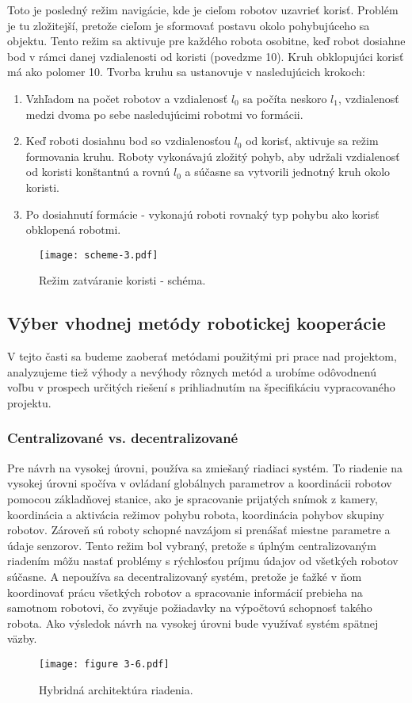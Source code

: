 Toto je posledný režim navigácie, kde je cieľom robotov uzavrieť korisť. Problém je tu zložitejší, pretože cieľom je sformovať postavu okolo pohybujúceho sa objektu. Tento režim sa aktivuje pre každého robota osobitne, keď robot dosiahne bod v rámci danej vzdialenosti od koristi (povedzme 10). Kruh obklopujúci korisť má ako polomer 10. Tvorba kruhu sa ustanovuje v nasledujúcich krokoch:
\begin{enumerate}
    \item Vzhľadom na počet robotov a vzdialenosť $l_0$ sa počíta
        neskoro $l_1$, vzdialenosť medzi dvoma po sebe nasledujúcimi robotmi vo formácii.
    \item Keď roboti dosiahnu bod so vzdialenosťou $l_0$ od
        korisť, aktivuje sa režim formovania kruhu. Roboty vykonávajú zložitý pohyb, aby udržali vzdialenosť od koristi konštantnú a rovnú $l_0$ a súčasne sa vytvorili
        jednotný kruh okolo koristi.
    \item Po dosiahnutí formácie - vykonajú roboti rovnaký typ pohybu ako korisť obklopená robotmi. 
\end{enumerate} 

\begin{figure}[ht!]
    \centering
    \texttt{[image: scheme-3.pdf]}
    \caption{Režim zatváranie koristi - schéma.}
    \label{o:39}
\end{figure}

\subsection{Výber vhodnej metódy robotickej kooperácie}
V tejto časti sa budeme zaoberať metódami použitými pri prace nad projektom, analyzujeme tiež výhody a nevýhody rôznych metód a urobíme odôvodnenú voľbu v prospech určitých riešení s prihliadnutím na špecifikáciu vypracovaného projektu.

\subsubsection{Centralizované vs. decentralizované}
Pre návrh na vysokej úrovni, používa sa zmiešaný riadiaci systém. To riadenie na vysokej úrovni spočíva v ovládaní globálnych parametrov a koordinácii robotov pomocou 
základňovej stanice, ako je spracovanie prijatých snímok z kamery, koordinácia a aktivácia režimov pohybu robota, 
koordinácia pohybov skupiny robotov. Zároveň sú roboty schopné navzájom si prenášať miestne parametre a údaje senzorov.
Tento režim bol vybraný, pretože s úplným centralizovaným riadením môžu nastať problémy s rýchlosťou príjmu údajov od všetkých robotov súčasne. 
A nepoužíva sa decentralizovaný systém, pretože je ťažké v ňom koordinovať prácu všetkých robotov a spracovanie informácií prebieha na samotnom robotovi, 
čo zvyšuje požiadavky na výpočtovú schopnosť takého robota. Ako výsledok návrh na vysokej úrovni bude využívať systém spätnej väzby. 
\begin{figure}[ht!]
    \centering
    \texttt{[image: figure 3-6.pdf]}
    \caption{Hybridná architektúra riadenia.}
    \label{o:310}
\end{figure}

